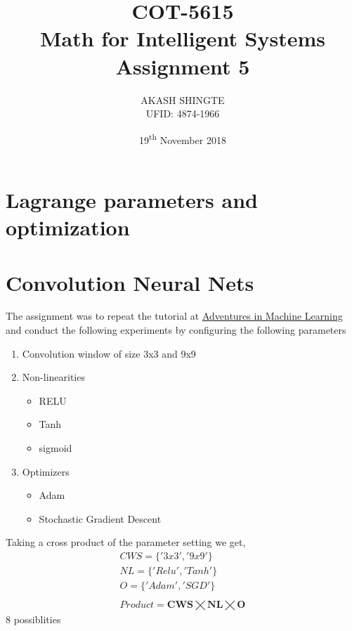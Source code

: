 \documentclass{article}
\title{COT-5615\\ Math for Intelligent Systems\\Assignment 5}
\author{AKASH SHINGTE\\UFID: 4874-1966}
\date{19\textsuperscript{th} November 2018}
\begin{document}
\maketitle

\section{Lagrange parameters and optimization}
\section{Convolution Neural Nets}

The assignment was to repeat the tutorial at
\href{http://adventuresinmachinelearning.com/keras-tutorial-cnn-11-lines/}{Adventures in Machine Learning} and conduct the following experiments by configuring the following parameters
\begin{enumerate}
    \item Convolution window of size 3x3 and 9x9
    \item Non-linearities
    \begin{itemize}
        \item RELU
        \item Tanh
        \item sigmoid
    \end{itemize}
    \item Optimizers
    \begin{itemize}
        \item Adam 
        \item Stochastic Gradient Descent
    \end{itemize}
\end{enumerate}
Taking a cross product of the parameter setting we get, 
\begin{eqnarray*}
CWS = \{'3x3', '9x9'\} \\
NL = \{'Relu', 'Tanh'\}\\
O = \{'Adam','SGD'\}\\
\\
Product = \mathbf{CWS} \bigtimes \mathbf{NL} \bigtimes \mathbf{O}
\end{eqnarray*}
8 possiblities
\end{document}
